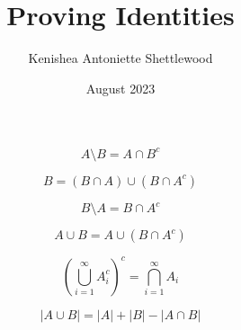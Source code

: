 \documentclass{article}
\title{Proving Identities}
\author{Kenishea Antoniette Shettlewood}
\date{August 2023}
\begin{document}
\maketitle

\[ A \setminus B = A \cap B^c \]

\[ B = (B \cap A) \cup (B \cap A^c) \]

\[ B \setminus A = B \cap A^c \]

\[ A \cup B = A \cup (B \cap A^c) \]

\[ \left(\bigcup_{i=1}^{\infty} A^c_i\right)^c = \bigcap_{i=1}^{\infty} A_i \]

\[ |A \cup B| = |A| + |B| - |A \cap B| \]
\end{document}
